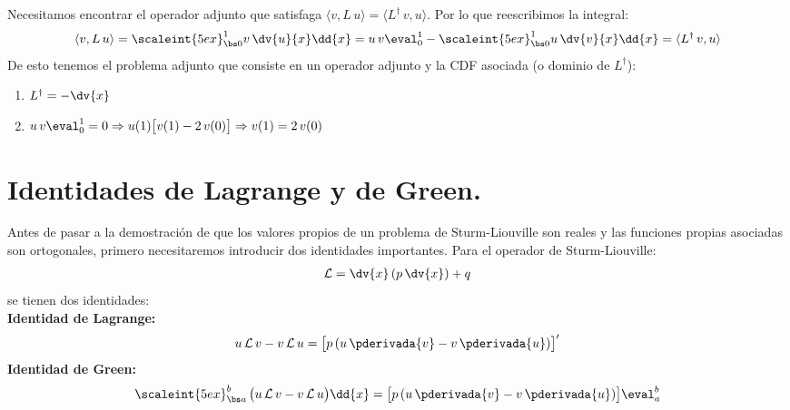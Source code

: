 Necesitamos encontrar el operador adjunto que satisfaga \hfill \break $\langle v, L \, u \rangle = \langle L^{\dagger} \, v, u \rangle$. Por lo que reescribimos la integral:
\begin{align*}
\langle v, L \, u \rangle = \scaleint{5ex}_{\bs 0}^{1} v \, \dv{u}{x} \dd{x} = u \, v \eval_{0}^{1} - \scaleint{5ex}_{\bs 0}^{1} u \, \dv{v}{x} \dd{x} = \langle L^{\dagger} \, v, u \rangle
\end{align*}
De esto tenemos el problema adjunto que consiste en un operador adjunto y la CDF asociada (o dominio de $L^{\dagger}$):
\begin{enumerate}
\item $L^{\dagger} = - \displaystyle \dv{x}$
\item $\displaystyle u \, v \eval_{0}^{1} = 0 \Rightarrow u(1) \big[ v(1) - 2 \, v(0) \big] \Rightarrow v(1) = 2 \, v(0)$
\end{enumerate}
\vspace{0.3cm}
\noindent

\section{Identidades de Lagrange y de Green.}

Antes de pasar a la demostración de que los valores propios de un problema de Sturm-Liouville son reales y las funciones propias asociadas son ortogonales, primero necesitaremos introducir dos identidades importantes. Para el operador de Sturm-Liouville:
\begin{align*}
\mathcal{L} = \dv{x} \left( p \, \dv{x} \right) + q
\end{align*}
se tienen dos identidades:
\\
\noindent
\textbf{Identidad de Lagrange:} 
\begin{align*}
u \, \mathcal{L} \, v - v \, \mathcal{L} \, u = \big[ p \, (u \, \pderivada{v} - v \, \pderivada{u}) \big]^{\prime}
\end{align*}
\noindent
\textbf{Identidad de Green:} 
\begin{align*}
\scaleint{5ex}_{\bs a}^{b} \, \big(u \, \mathcal{L} \, v - v \, \mathcal{L} \, u \big) \dd{x} = \big[ p \, (u \, \pderivada{v} - v \, \pderivada{u}) \big]\eval_{a}^{b}
\end{align*}


